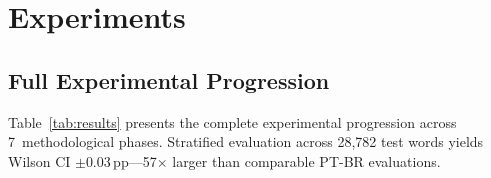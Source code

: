 \documentclass[conference]{IEEEtran}
\begin{document}
\section{Experiments}
\label{sec:results}

\subsection{Full Experimental Progression}

Table~\ref{tab:results} presents the complete experimental
progression across 7~methodological phases.
Stratified evaluation across 28{,}782 test words yields Wilson CI
$\pm$0.03\,pp---57$\times$ larger than comparable PT-BR
evaluations.
\end{document}
